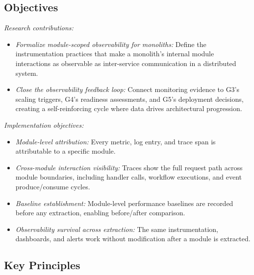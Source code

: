 \subsection*{Objectives}

\emph{Research contributions:}
\begin{itemize}[itemsep=8pt,topsep=2pt]
  \item \emph{Formalize module-scoped observability for monoliths:} Define the instrumentation practices that make a monolith's internal module interactions as observable as inter-service communication in a distributed system.
  \item \emph{Close the observability feedback loop:} Connect monitoring evidence to G3's scaling triggers, G4's readiness assessments, and G5's deployment decisions, creating a self-reinforcing cycle where data drives architectural progression.
\end{itemize}

\emph{Implementation objectives:}
\begin{itemize}[itemsep=8pt,topsep=2pt]
  \item \emph{Module-level attribution:} Every metric, log entry, and trace span is attributable to a specific module.
  \item \emph{Cross-module interaction visibility:} Traces show the full request path across module boundaries, including handler calls, workflow executions, and event produce/consume cycles.
  \item \emph{Baseline establishment:} Module-level performance baselines are recorded before any extraction, enabling before/after comparison.
  \item \emph{Observability survival across extraction:} The same instrumentation, dashboards, and alerts work without modification after a module is extracted.
\end{itemize}

\subsection*{Key Principles}

